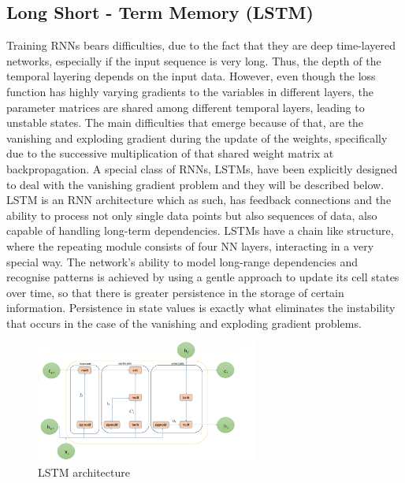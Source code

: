     \subsection{ Long Short - Term Memory (LSTM)} \label{subsec:lstm}
    Training RNNs bears difficulties, due to the fact that they are deep time-layered networks, especially if the input sequence is very long. Thus, the depth of the temporal layering depends on the input data. However, even though the loss function has highly varying gradients to the variables in different layers, the parameter matrices are shared among different temporal layers, leading to unstable states. The main difficulties that emerge because of that, are the vanishing and exploding gradient during the update of the weights, specifically due to the successive multiplication of that shared weight matrix at backpropagation. A special class of RNNs, LSTMs, have been explicitly designed to deal with the vanishing gradient problem and they will be described below.
    LSTM is an RNN architecture which as such, has feedback connections and the ability to process not only single data points but also sequences of data, also capable of handling long-term dependencies. LSTMs have a chain like structure, where the repeating module consists of four NN layers, interacting in a very special way. The network's ability to model long-range dependencies and recognise patterns is achieved by using a gentle approach to update its cell states over time, so that there is greater persistence in the storage of certain information. Persistence in state values is exactly what eliminates the instability that occurs in the case of the vanishing and exploding gradient problems.

    \begin{figure}[h]
        \centering
        \includegraphics[width=0.65\textwidth]{media/lstm_simple.png}
        \caption{LSTM architecture}
        \label{fig:lstm}
    \end{figure}
    
